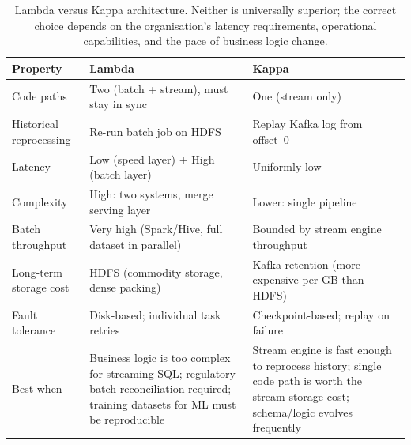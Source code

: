 \begin{table}[htbp]
\centering
\renewcommand{\arraystretch}{1.4}
\begin{tabular}{lp{4.8cm}p{4.8cm}}
  \toprule
  \textbf{Property}
    & \textbf{Lambda}
    & \textbf{Kappa} \\
  \midrule
  Code paths
    & Two (batch + stream), must stay in sync
    & One (stream only) \\
  Historical reprocessing
    & Re-run batch job on HDFS
    & Replay Kafka log from offset~0 \\
  Latency
    & Low (speed layer) $+$ High (batch layer)
    & Uniformly low \\
  Complexity
    & High: two systems, merge serving layer
    & Lower: single pipeline \\
  Batch throughput
    & Very high (Spark/Hive, full dataset in parallel)
    & Bounded by stream engine throughput \\
  Long-term storage cost
    & HDFS (commodity storage, dense packing)
    & Kafka retention (more expensive per GB than HDFS) \\
  Fault tolerance
    & Disk-based; individual task retries
    & Checkpoint-based; replay on failure \\
  Best when
    & Business logic is too complex for streaming SQL;
      regulatory batch reconciliation required;
      training datasets for ML must be reproducible
    & Stream engine is fast enough to reprocess history;
      single code path is worth the stream-storage cost;
      schema/logic evolves frequently \\
  \bottomrule
\end{tabular}
\caption{Lambda versus Kappa architecture. Neither is universally superior;
         the correct choice depends on the organisation's latency requirements,
         operational capabilities, and the pace of business logic change.}
\label{tab:lambda-vs-kappa}
\end{table}

